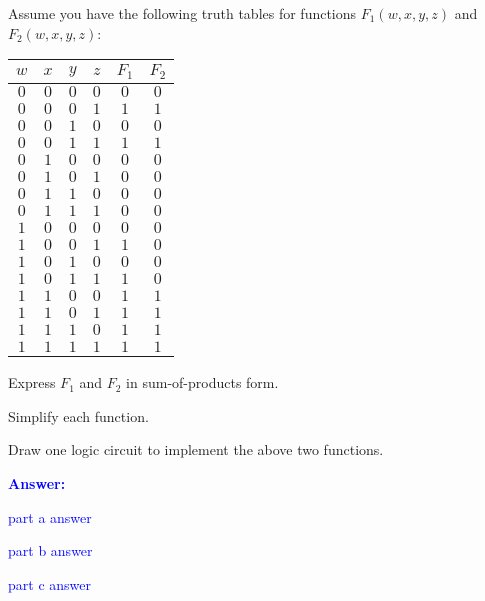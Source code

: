 \item{}
Assume you have the following truth tables for functions $F_1(w,x,y,z)$ and
$F_2(w,x,y,z)$:\\[6pt]
\begin{tabular}{cccc|cc}
    \hline
    {\bf $w$} & {\bf $x$} & {\bf $y$} & {\bf $z$} & {\bf $F_1$} & {\bf $F_2$} \\
    \hline\hline
    $0$ & $0$ & $0$ & $0$ & $0$ & $0$ \\ \hline
    $0$ & $0$ & $0$ & $1$ & $1$ & $1$ \\ \hline
    $0$ & $0$ & $1$ & $0$ & $0$ & $0$ \\ \hline
    $0$ & $0$ & $1$ & $1$ & $1$ & $1$ \\ \hline
    $0$ & $1$ & $0$ & $0$ & $0$ & $0$ \\ \hline
    $0$ & $1$ & $0$ & $1$ & $0$ & $0$ \\ \hline
    $0$ & $1$ & $1$ & $0$ & $0$ & $0$ \\ \hline
    $0$ & $1$ & $1$ & $1$ & $0$ & $0$ \\ \hline
    $1$ & $0$ & $0$ & $0$ & $0$ & $0$ \\ \hline
    $1$ & $0$ & $0$ & $1$ & $1$ & $0$ \\ \hline
    $1$ & $0$ & $1$ & $0$ & $0$ & $0$ \\ \hline
    $1$ & $0$ & $1$ & $1$ & $1$ & $0$ \\ \hline
    $1$ & $1$ & $0$ & $0$ & $1$ & $1$ \\ \hline
    $1$ & $1$ & $0$ & $1$ & $1$ & $1$ \\ \hline
    $1$ & $1$ & $1$ & $0$ & $1$ & $1$ \\ \hline
    $1$ & $1$ & $1$ & $1$ & $1$ & $1$ \\ \hline
\end{tabular}
\begin{list}{\textbf{}}{}
    \item Express $F_1$ and $F_2$ in sum-of-products form.
    \item Simplify each function.
    \item Draw one logic circuit to implement the above two functions.
\end{list}
\vskip12pt
\ifanswers
\textcolor{blue}{
\textbf{Answer:}\\
\begin{list}{\textbf{}}{}
    \item part a answer
    \item part b answer
    \item part c answer
\end{list}
}
\newpage
\fi
